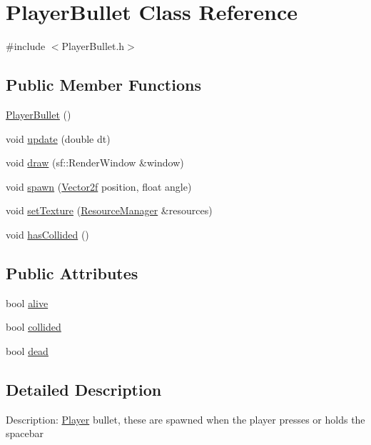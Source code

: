 \hypertarget{class_player_bullet}{}\section{Player\+Bullet Class Reference}
\label{class_player_bullet}


{\ttfamily \#include $<$Player\+Bullet.\+h$>$}

\subsection*{Public Member Functions}
\begin{DoxyCompactItemize}
\item 
\mbox{\hyperlink{class_player_bullet_aff2ce7ed2770a6450664f489c9513375}{Player\+Bullet}} ()
\item 
void \mbox{\hyperlink{class_player_bullet_add66f3caf483efe8879473f690d22b55}{update}} (double dt)
\item 
void \mbox{\hyperlink{class_player_bullet_ae599666f9f057599c6f7e45d1d025817}{draw}} (sf\+::\+Render\+Window \&window)
\item 
void \mbox{\hyperlink{class_player_bullet_ae14424d24491ecd17a07aa3ed1864135}{spawn}} (\mbox{\hyperlink{class_vector2f}{Vector2f}} position, float angle)
\item 
void \mbox{\hyperlink{class_player_bullet_a40c95b75eec29f424360a9b478910c71}{set\+Texture}} (\mbox{\hyperlink{class_resource_manager}{Resource\+Manager}} \&resources)
\item 
void \mbox{\hyperlink{class_player_bullet_ac36db806a8b41961134ad72d1e7136a5}{has\+Collided}} ()
\end{DoxyCompactItemize}
\subsection*{Public Attributes}
\begin{DoxyCompactItemize}
\item 
bool \mbox{\hyperlink{class_player_bullet_a8fd39df74f1886467118c6b7b5caed39}{alive}}
\item 
bool \mbox{\hyperlink{class_player_bullet_a3b1de396870aea406eeb3302b7d57463}{collided}}
\item 
bool \mbox{\hyperlink{class_player_bullet_a831e4e774e0f022e7149de9d62a58e5a}{dead}}
\end{DoxyCompactItemize}


\subsection{Detailed Description}
Description\+: \mbox{\hyperlink{class_player}{Player}} bullet, these are spawned when the player presses or holds the spacebar 

